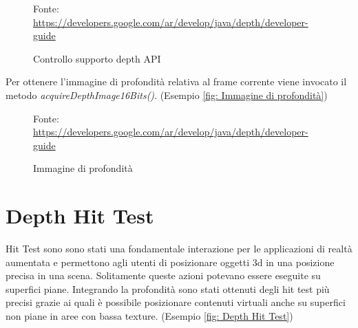 \documentclass[crop=false, class=book]{standalone}
\begin{document}
		\begin{figure}
			\centering
			{Fonte: \url{https://developers.google.com/ar/develop/java/depth/developer-guide}}
			\caption{Controllo supporto depth API}
			\label{fig: Controllo supporto depth API}
		\end{figure}
		
		\begin{flushleft}
		Per ottenere l'immagine di profondità relativa al frame corrente viene invocato il metodo 										\textit{acquireDepthImage16Bits()}. (Esempio \vref{fig: Immagine di profondità})\\
		\end{flushleft}
		\begin{figure}
			\centering
			{Fonte: \url{https://developers.google.com/ar/develop/java/depth/developer-guide}}
			\caption{Immagine di profondità}
			\label{fig: Immagine di profondità}
		\end{figure}
		
		\section{Depth Hit Test}
		
		Hit Test sono sono stati una fondamentale interazione per le applicazioni di realtà aumentata e permettono agli utenti 			di posizionare oggetti 3d in una posizione precisa in una scena. Solitamente queste azioni potevano essere eseguite su 			superfici piane. Integrando la profondità sono stati ottenuti degli hit test più precisi grazie ai quali è possibile  			posizionare contenuti virtuali anche su superfici non piane in aree con bassa texture. (Esempio \vref{fig: Depth Hit Test})\\
\end{document}
